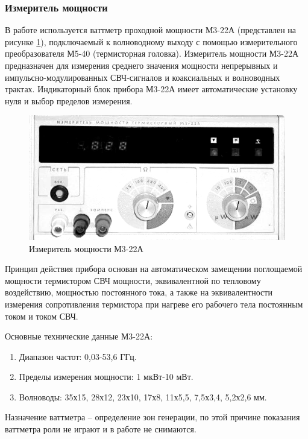 \documentclass[a4paper,14pt]{extarticle}
\begin{document}
	\subsubsection{Измеритель мощности}

	В работе используется ваттметр проходной мощности М3-22А (представлен на рисунке \ref{figm}), подключаемый к волноводному выходу с помощью измерительного преобразователя М5-40 (термисторная головка). Измеритель мощности М3-22А предназначен для измерения среднего значения мощности непрерывных и импульсно-модулированных СВЧ-сигналов и коаксиальных и волноводных трактах. Индикаторный блок прибора М3-22А имеет автоматические установку нуля и выбор пределов измерения.
	
	\begin{figure}[h]
		\center
		\includegraphics[width = \textwidth]{images/m3-22a.png}
		\caption{Измеритель мощности М3-22А}
		\label{figm}
	\end{figure}
	
	Принцип действия прибора основан на автоматическом замещении поглощаемой мощности термистором СВЧ мощности, эквивалентной по тепловому воздействию, мощностью постоянного тока, а также на эквивалентности измерения сопротивления термистора при нагреве его рабочего тела постоянным током и током СВЧ.
	
	Основные технические данные М3-22А:
	\begin{enumerate}
		\item	Диапазон частот: 0,03-53,6 ГГц.
		\item	Пределы измерения мощности: 1 мкВт-10 мВт.
		\item	Волноводы: 35х15, 28х12, 23х10, 17х8, 11х5,5, 7,5х3,4, 5,2х2,6 мм.
	\end{enumerate}
	
	Назначение ваттметра -- определение зон генерации, по этой причине показания ваттметра роли не играют и в работе не снимаются. 
	
\end{document}
